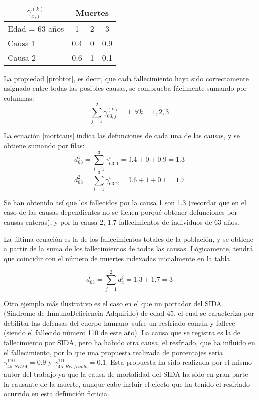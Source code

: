 \documentclass{article}
\begin{document}
\begin{table}[H]
\centering
\label{ejemplo}
\begin{tabular}{|l|c|c|c|}
\hline
\multicolumn{1}{|c|}{\textbf{$\gamma_{x,j}^{(k)}$}} & \multicolumn{3}{c|}{Muertes} \\ \hline
\multicolumn{1}{|c|}{Edad = 63 años}                     & 1        & 2      & 3        \\ \hline
Causa 1                                          & 0.4      & 0      & 0.9      \\
Causa 2                                         & 0.6      & 1      & 0.1      \\ \hline
\end{tabular}
\end{table}

La propiedad \ref{probtot}, es decir, que cada fallecimiento haya sido correctamente asignado entre todas las posibles causas, se comprueba fácilmente sumando por columnas:
$$
\sum_{j=1}^{2}\gamma_{63,j}^{(k)}=1\,\,\,\forall k=1,2,3
$$

La ecuación \ref{mortcaus} indica las defunciones de cada una de las causas, y se obtiene sumando por filas:
$$
d_{63}^{1}=\sum_{i=1}^{3}\gamma_{63,1}^{i}=0.4+0+0.9=1.3
$$
$$
d_{63}^{2}=\sum_{i=1}^{3}\gamma_{63,2}^{i}=0.6+1+0.1=1.7
$$

Se han obtenido así que los fallecidos por la causa 1 son 1.3 (recordar que en el caso de las causas dependientes no se tienen porqué obtener defunciones por causas enteras), y por la causa 2, 1.7 fallecimientos de individuos de 63 años.

La última ecuación es la de los fallecimientos totales de la población\label{mort}, y se obtiene a partir de la suma de los fallecimientos de todas las causas.  Lógicamente, tendrá que coincidir con el número de muertes indexadas inicialmente en la tabla.

$$
d_{63}=\sum_{j=1}^{2}d_{x}^{j}=1.3+1.7=3
$$

Otro ejemplo más ilustrativo es el caso en el que un portador del SIDA (Síndrome de InmunoDeficiencia Adquirido) de edad 45, el cual se caracteriza por debilitar las defensas del cuerpo humano, sufre un resfriado común y fallece (siendo el fallecido número 110 de este año). La causa que se registra es la de fallecimiento por SIDA, pero ha habido otra causa, el resfriado, que ha influido en el fallecimiento, por lo que una propuesta realizada de porcentajes sería $\gamma_{45,SIDA}^{110}=0.9$ y $\gamma_{45,Resfriado}^{110}=0.1$. Esta propuesta ha sido realizada por el mismo autor del trabajo ya que la causa de mortalidad del SIDA ha sido en gran parte la causante de la muerte, aunque cabe incluir el efecto que ha tenido el resfriado ocurrido en esta defunción ficticia.
\end{document}
